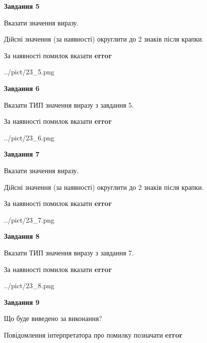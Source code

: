 \documentclass[11pt, ukrainian]{article}
\begin{document}
{\begin {large}
{\begin {center}\textbf{Завдання 5}\end {center}}\par
Вказати значення виразу. \par
Дійсні значення (за наявності) округлити до 2 знаків після крапки. \par
За наявності помилок вказати \textbf{error}

\begin{center}
	{../pict/23_5.png}
\end{center}
\newpage

{\begin {center}\textbf{Завдання 6}\end {center}}\par
Вказати ТИП значення виразу з завдання 5. \par
За наявності помилок вказати \textbf{error}

\begin{center}
	{../pict/23_6.png}
\end{center}
\newpage

{\begin {center}\textbf{Завдання 7}\end {center}}\par
Вказати значення виразу. \par
Дійсні значення (за наявності) округлити до 2 знаків після крапки. \par
За наявності помилок вказати \textbf{error}

\begin{center}
	{../pict/23_7.png}
\end{center}
\newpage

{\begin {center}\textbf{Завдання 8}\end {center}}\par
Вказати ТИП значення виразу з завдання 7. \par
За наявності помилок вказати \textbf{error}

\begin{center}
	{../pict/23_8.png}
\end{center}
\newpage

{\begin {center}\textbf{Завдання 9}\end {center}}\par
Що буде виведено за виконання? \par
Повідомлення інтерпретатора про помилку позначати \textbf{error}


\end{large}}
\end{document}
